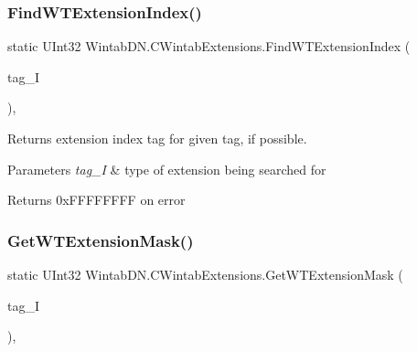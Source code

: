 \subsubsection{\texorpdfstring{Find\+W\+T\+Extension\+Index()}{FindWTExtensionIndex()}}
{\footnotesize\ttfamily static U\+Int32 Wintab\+D\+N.\+C\+Wintab\+Extensions.\+Find\+W\+T\+Extension\+Index (\begin{DoxyParamCaption}\item[{\mbox{\hyperlink{namespace_wintab_d_n_a303ef868b8887dc43872ddac8a7d059b}{E\+W\+T\+X\+Extension\+Tag}}}]{tag\+\_\+I }\end{DoxyParamCaption})\hspace{0.3cm}{\ttfamily [inline]}, {\ttfamily [static]}}



Returns extension index tag for given tag, if possible. 


\begin{DoxyParams}{Parameters}
{\em tag\+\_\+I} & type of extension being searched for\\
\hline
\end{DoxyParams}
\begin{DoxyReturn}{Returns}
0x\+F\+F\+F\+F\+F\+F\+FF on error
\end{DoxyReturn}
\mbox{\label{class_wintab_d_n_1_1_c_wintab_extensions_ab68b335cdc5010dab82f1941d39fea67}} 
\subsubsection{\texorpdfstring{Get\+W\+T\+Extension\+Mask()}{GetWTExtensionMask()}}
{\footnotesize\ttfamily static U\+Int32 Wintab\+D\+N.\+C\+Wintab\+Extensions.\+Get\+W\+T\+Extension\+Mask (\begin{DoxyParamCaption}\item[{\mbox{\hyperlink{namespace_wintab_d_n_a303ef868b8887dc43872ddac8a7d059b}{E\+W\+T\+X\+Extension\+Tag}}}]{tag\+\_\+I }\end{DoxyParamCaption})\hspace{0.3cm}{\ttfamily [inline]}, {\ttfamily [static]}}



